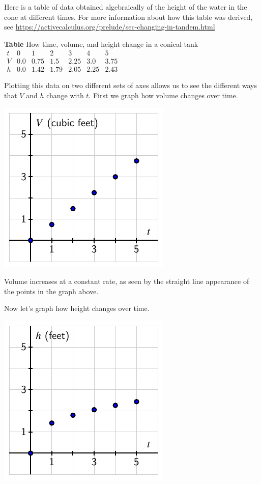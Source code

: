 \documentclass{ximera}
\begin{document}

Here is a table of data obtained algebraically of the height of the water in the cone at different times.  For more information about how this table was derived, see \url{https://activecalculus.org/prelude/sec-changing-in-tandem.html}

\begin{center}
\textbf{Table} How time, volume, and height change in a conical tank
\(
\begin{array}{lllllll}
t&0&1&2&3&4&5\\
\hline
V&0.0&0.75&1.5&2.25&3.0&3.75\\
\hline
h&0.0&1.42&1.79&2.05&2.25&2.43
\end{array}
\)
\end{center}


Plotting this data on two different sets of axes allows us to see the different ways that \(V\) and \(h\) change with \(t\).  First we graph how volume changes over time.

\begin{image}
\includegraphics{tandem-cone-V-t}
\end{image}

Volume increases at a constant rate, as seen by the straight line appearance of the points in the graph above.  

Now let's graph how height changes over time.

\begin{image}
\includegraphics{tandem-cone-h-t}
\end{image}
\end{document}
